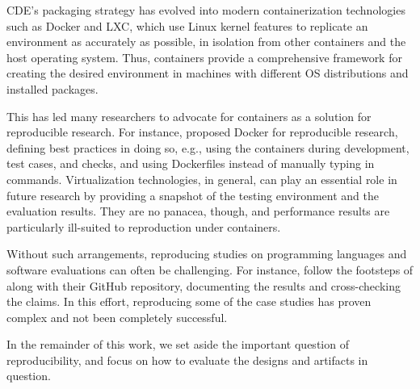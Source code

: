 CDE's packaging strategy has evolved into modern containerization technologies such as Docker and LXC, which use Linux kernel features to replicate an environment as accurately as possible, in isolation from other containers and the host operating system. Thus, containers provide a comprehensive framework for creating the desired environment in machines with different OS distributions and installed packages. 

This has led many researchers to advocate for containers as a solution for reproducible research. For instance,  proposed Docker for reproducible research, defining best practices in doing so, e.g., using the containers during development, test cases, and checks, and using Dockerfiles instead of manually typing in commands. Virtualization technologies, in general, can play an essential role in future research by providing a snapshot of the testing environment and the evaluation results. They are no panacea, though, and performance results are particularly ill-suited to reproduction under containers.

Without such arrangements, reproducing studies on programming languages and software evaluations can often be challenging. For instance,  follow the footsteps of  along with their GitHub repository, documenting the results and cross-checking the claims. In this effort, reproducing some of the case studies has proven complex and not been completely successful.

In the remainder of this work, we set aside the important question of reproducibility, and focus on how to evaluate the designs and artifacts in question.
